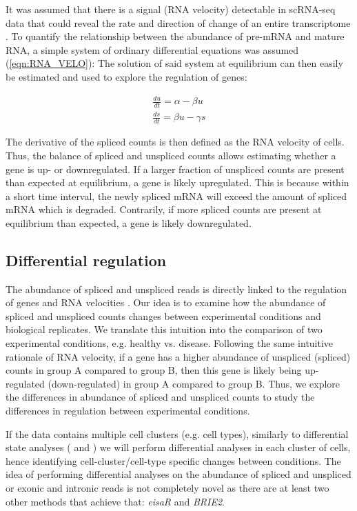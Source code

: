 It was assumed that there is a signal (RNA velocity) detectable in scRNA-seq data that could reveal the rate and direction of change of an entire transcriptome \citep{rna_velo}. To quantify the relationship between the abundance of pre-mRNA and mature RNA, a simple system of ordinary differential equations was assumed (\ref{eqn:RNA_VELO}): The solution of said system at equilibrium can then easily be estimated and used to explore the regulation of genes:

\begin{equation}
\begin{array}{l}
\frac{du}{dt} = \alpha - \beta u \\
\frac{ds}{dt} = \beta u - \gamma s
\end{array}
\label{eqn:RNA_VELO}
\end{equation}

The derivative of the spliced counts is then defined as the RNA velocity of cells. Thus, the balance of spliced and unspliced counts allows estimating whether a gene is up- or downregulated. If a larger fraction of unspliced counts are present than expected at equilibrium, a gene is likely upregulated. This is because within a short time interval, the newly spliced mRNA will exceed the amount of spliced mRNA which is degraded. Contrarily, if more spliced counts are present at equilibrium than expected, a gene is likely downregulated.

\subsection{Differential regulation}
The abundance of spliced and unspliced reads is directly linked to the regulation of genes and RNA velocities \citep{rna_velo}. Our idea is to examine how the abundance of spliced and unspliced counts changes between experimental conditions and biological replicates. We translate this intuition into the comparison of two experimental conditions, e.g. healthy vs. disease. Following the same intuitive rationale of RNA velocity, if a gene has a higher abundance of unspliced (spliced) counts in group A  compared to group B, then this gene is likely being up-regulated (down-regulated) in group A compared to group B. Thus, we explore the differences in abundance of spliced and unspliced counts to study the differences in regulation between experimental conditions.

If the data contains multiple cell clusters (e.g. cell types), similarly to differential state analyses (\cite{muscat} and \cite{distinct}) we will perform differential analyses in each cluster of cells, hence identifying cell-cluster/cell-type specific changes between conditions. The idea of performing differential analyses on the abundance of spliced and unspliced or exonic and intronic reads is not completely novel as there are at least two other methods that achieve that: \emph{eisaR} and \emph{BRIE2}.

